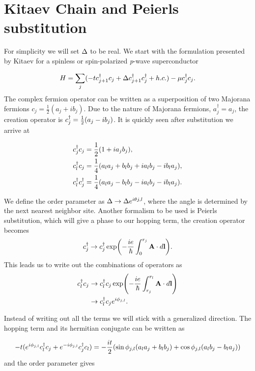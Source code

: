 \section{Kitaev Chain and Peierls substitution}

\par
For simplicity we will set $\Delta$ to be real.
We start with the formulation presented by Kitaev for a spinless or spin-polarized \textit{p}-wave superconductor

\begin{equation}
  H = \sum_j (-tc^{\dagger}_{j+1} c_j + \Delta c^{\dagger}_{j+1}c^{\dagger}_j + h.c.) - \mu c^{\dagger}_j c_j.
\end{equation}
The complex fermion operator can be written as a superposition of two Majorana fermions $c_j = \frac{1}{2} (a_j + i b_j)$.
Due to the nature of Majorana fermions, $a^{\dagger}_j = a_j$, the creation operator is $c^{\dagger}_j = \frac{1}{2} (a_j - i b_j)$.
It is quickly seen after substitution we arrive at

\begin{align}
  c^{\dagger}_j c_j &= \frac{1}{2} (1 + i a_j b_j), \\
  c^{\dagger}_l c_j &= \frac{1}{4} (a_l a_j + b_l b_j + i a_l b_j - i b_l a_j), \\
  c^{\dagger}_l c^{\dagger}_j &= \frac{1}{4} (a_l a_j - b_l b_j - i a_l b_j - i b_l a_j).
\end{align}

We define the order parameter as $\Delta \rightarrow \Delta e^{i \theta{j,l}}$,
where the angle is determined by the next nearest neighbor site.
Another formalism to be used is Peierls substitution, which will give a phase to our hopping term, the creation operator becomes
\begin{align}
  c^{\dagger}_j \rightarrow c^{\dagger}_j \exp(-\dfrac{i e}{\hbar} \int_0^{r_j} \mathbf{A} \cdot d\mathbf{l}).
\end{align}
This leads us to write out the combinations of operators as
\begin{align}
  c^{\dagger}_l c_j &\rightarrow c^{\dagger}_l c_j \exp(-\dfrac{i e}{\hbar} \int_{r_j}^{r_l} \mathbf{A} \cdot d\mathbf{l}) \nonumber \\
  &\rightarrow c^{\dagger}_l c_j e^{i \phi_{j,l}}.
\end{align}

Instead of writing out all the terms we will stick with a generalized direction.
The hopping term and its hermitian conjugate can be written as

\begin{equation}
  -t ( e^{i\phi_{j,l}} c^{\dagger}_l c_j + e^{-i\phi_{j,l}} c^{\dagger}_j c_l) = -\dfrac{it}{2} ( \sin\phi_{j,l} (a_l a_j + b_l b_j) + \cos\phi_{j,l} (a_l b_j - b_l a_j) )
\end{equation}
and the order parameter gives

